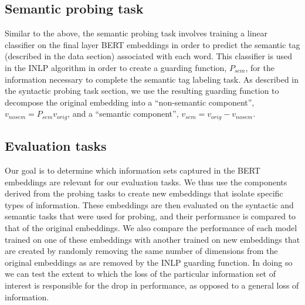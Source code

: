 \documentclass[11pt,a4paper]{article}
\begin{document}
\subsection{Semantic probing task}
\label{sec:semantics}

Similar to the above, the semantic probing task involves training a linear classifier on the final layer BERT embeddings in order to predict the semantic tag (described in the data section) associated with each word. This classifier is used in the INLP algorithm in order to create a guarding function, $P_{sem}$, for the information necessary to complete the semantic tag labeling task. As described in the syntactic probing task section, we use the resulting guarding function to decompose the original embedding into a ``non-semantic component'', $v_{no sem} = P_{sem} v_{orig}$, and a ``semantic component'', $v_{sem} = v_{orig} - v_{no sem}$. 


\subsection{Evaluation tasks}
\label{sec:eval}

Our goal is to determine which information sets captured in the BERT embeddings are relevant for our evaluation tasks. We thus use the components derived from the probing tasks to create new embeddings that isolate specific types of information. These embeddings are then evaluated on the syntactic and semantic tasks that were used for probing, and their performance is compared to that of the original embeddings. We also compare the performance of each model trained on one of these embeddings with another trained on new embeddings that are created by randomly removing the same number of dimensions from the original embeddings as are removed by the INLP guarding function. In doing so we can test the extent to which the loss of the particular information set of interest is responsible for the drop in performance, as opposed to a general loss of information. 

\end{document}
